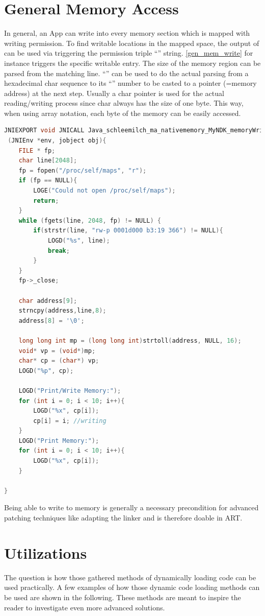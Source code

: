 \section{General Memory Access}\label{section:general_mem_access}
In general, an App can write into every memory section which is mapped with writing permission. To find writable locations in the mapped space, the output of  can be used via triggering the permission triple ``'' string. \autoref{gen_mem_write} for instance triggers the specific writable  entry. The size of the memory region can be parsed from the matching line. ``'' can be used to do the actual parsing from a
hexadecimal char sequence to its ``'' number to be casted to a pointer (=memory address) at the next step.
Usually a char pointer is used for the actual reading/writing process
since char always has the size of one byte. This way, when using array notation, each byte of the memory can be easily accessed.
\begin{lstlisting}[language=C++, caption=memoryWriting(), label=gen_mem_write]
JNIEXPORT void JNICALL Java_schleemilch_ma_nativememory_MyNDK_memoryWriting
 (JNIEnv *env, jobject obj){
    FILE * fp;
    char line[2048];
    fp = fopen("/proc/self/maps", "r");
    if (fp == NULL){
        LOGE("Could not open /proc/self/maps");
        return;
    }
    while (fgets(line, 2048, fp) != NULL) {
        if(strstr(line, "rw-p 0001d000 b3:19 366") != NULL){
            LOGD("%s", line);
            break;
        }
    }
    fp->_close;

    char address[9];
    strncpy(address,line,8);
    address[8] = '\0';

    long long int mp = (long long int)strtoll(address, NULL, 16);
    void* vp = (void*)mp;
    char* cp = (char*) vp;
    LOGD("%p", cp);

    LOGD("Print/Write Memory:");
    for (int i = 0; i < 10; i++){
        LOGD("%x", cp[i]);
        cp[i] = i; //writing
    }
    LOGD("Print Memory:");
    for (int i = 0; i < 10; i++){
        LOGD("%x", cp[i]);
    }

}
\end{lstlisting}
Being able to write to memory is generally a necessary precondition for advanced patching techniques like adapting the linker and is therefore doable in ART.

\section{Utilizations}
The question is how those gathered methods of dynamically loading code can be
used practically. A few examples of how those dynamic code loading methods can be used
are shown in the following. These methods are meant to inspire the reader to investigate even more advanced solutions.

